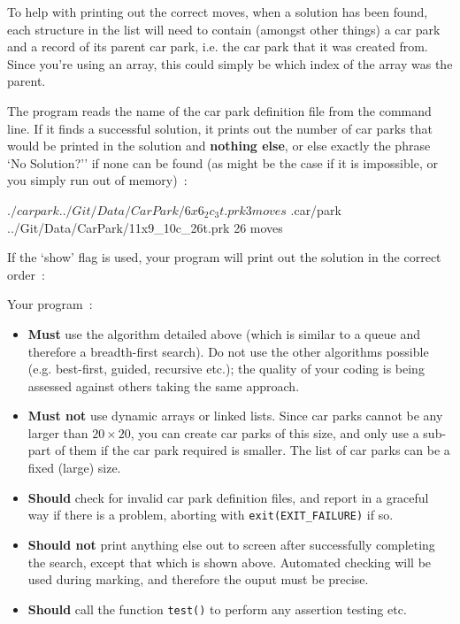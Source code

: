 \begin{exercise}
\noindent To help with printing out the correct moves, when a solution
has been found, each structure in the list will need to contain (amongst
other things) a car park and a record of its parent car park, i.e. the car park
that it was created from. Since you're using an array, this could simply
be which index of the array was the parent.

\noindent The program reads the name of the car park definition file from
the command line.  If it finds a successful solution, it prints out the
number of car parks that would be printed in the solution and {\bf nothing
else}, or else exactly the phrase `No Solution?'' if none can be found
(as might be the case if it is impossible, or you simply run out of memory)~:

\begin{terminaloutput}
$ ./carpark ../Git/Data/CarPark/6x6_2c_3t.prk
3 moves
$ .car/park ../Git/Data/CarPark/11x9_10c_26t.prk
26 moves
\end{terminaloutput}

If the `show' flag is used, your program will print out the solution in the correct order~:

\noindent
Your program~:
\begin{itemize}
\item {\bf Must} use the algorithm detailed above (which is similar to a queue and therefore a breadth-first search). Do not use the other algorithms possible (e.g. best-first, guided, recursive etc.); the quality of your coding is being assessed against others taking the same approach.
\item {\bf Must not} use dynamic arrays or linked lists. Since car parks cannot be any larger than $20 $, you can create car parks of this size, and only use a sub-part of them if the car park required is smaller. The list of car parks can be a fixed (large) size.
\item {\bf Should} check for invalid car park definition files, and report in a graceful way if there is a problem, aborting with \verb^exit(EXIT_FAILURE)^ if so.
\item {\bf Should not} print anything else out to screen after successfully
completing the search, except that which is shown above. Automated checking
will be used during marking, and therefore the ouput must be precise.
\item {\bf Should} call the function \verb^test()^ to perform any assertion testing etc.
\end{itemize}


\end{exercise}
